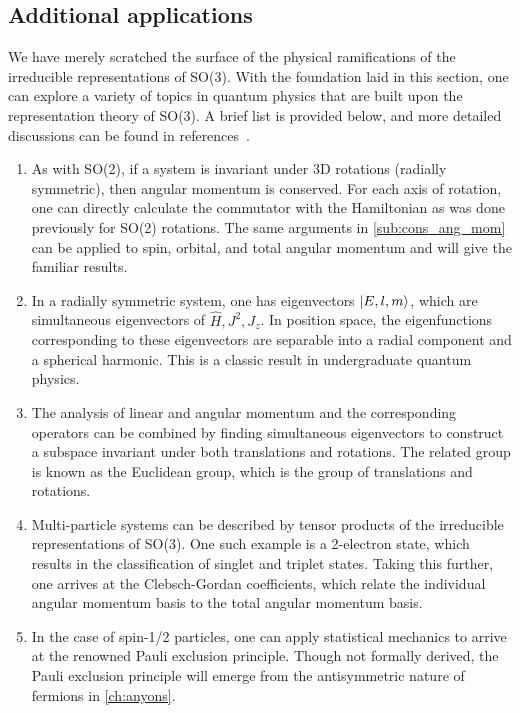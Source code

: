 

\subsection{Additional applications}
We have merely scratched the surface of the physical ramifications of the irreducible representations of SO(3). With the foundation laid in this section, one can explore a variety of topics in quantum physics that are built upon the representation theory of SO(3). A brief list is provided below, and more detailed discussions can be found in references~\cite{Griffiths2018,Hall2013,Tung1985}.
\begin{enumerate}
    \item As with SO(2), if a system is invariant under 3D rotations (radially symmetric), then angular momentum is conserved. For each axis of rotation, one can directly calculate the commutator with the Hamiltonian as was done previously for SO(2) rotations. The same arguments in \cref{sub:cons_ang_mom} can be applied to spin, orbital, and total angular momentum and will give the familiar results.
    \item In a radially symmetric system, one has eigenvectors $\ket{E,l,m}$, which are simultaneous eigenvectors of $\hat{H},J^2,J_z$. In position space, the eigenfunctions corresponding to these eigenvectors are separable into a radial component and a spherical harmonic. This is a classic result in undergraduate quantum physics.
    \item The analysis of linear and angular momentum and the corresponding operators can be combined by finding simultaneous eigenvectors to construct a subspace invariant under both translations and rotations. The related group is known as the Euclidean group, which is the group of translations and rotations.
    \item Multi-particle systems can be described by tensor products of the irreducible representations of SO(3). One such example is a 2-electron state, which results in the classification of singlet and triplet states. Taking this further, one arrives at the Clebsch-Gordan coefficients, which relate the individual angular momentum basis to the total angular momentum basis.
    \item In the case of spin-1/2 particles, one can apply statistical mechanics to arrive at the renowned Pauli exclusion principle. Though not formally derived, the Pauli exclusion principle will emerge from the antisymmetric nature of fermions in \cref{ch:anyons}.
\end{enumerate}

